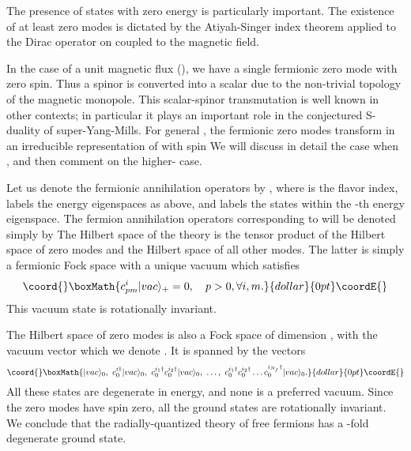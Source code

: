 \documentclass[a4paper,12pt, amsfonts, amssymb]{article}
\begin{document}
The presence of \coordHE{} states with zero energy is particularly important. 
The existence of at least \coordHE{} zero modes is dictated by the Atiyah-Singer 
index theorem applied to the Dirac operator on \coordHE{} coupled to the
magnetic field. 

In the case of a unit magnetic flux (\coordHE{}), we have a single fermionic
zero mode with zero spin. Thus a spinor is converted into a scalar
due to the non-trivial topology of the magnetic monopole. This 
scalar-spinor transmutation is well known in other contexts;
in particular it plays an important role in the conjectured S-duality
of \coordHE{}  \coordHE{} super-Yang-Mills. For general \coordHE{}, the fermionic zero
modes transform in an irreducible representation of \coordHE{} with spin
\coordHE{} We will discuss in detail the case when \coordHE{}, 
and then comment on the higher-\coordHE{} case.

Let us denote the fermionic
annihilation operators by \coordHE{}, where \coordHE{} is the
flavor index, \coordHE{} labels the energy eigenspaces as above,
and \coordHE{} labels the states within the \coordHE{}-th
energy eigenspace. The fermion annihilation operators corresponding to
\coordHE{} will be denoted simply by \coordHE{}
The Hilbert space of the theory is the tensor product of the Hilbert
space of zero modes and the Hilbert space of all other modes.
The latter is simply a fermionic Fock space with a unique vacuum
\coordHE{} which satisfies
$$\coord{}\boxMath{
c^i_{pm}|vac\rangle_+=0,\quad p>0,\forall i,m.
}{dollar}{0pt}\coordE{}$$
This vacuum state is rotationally invariant.

The Hilbert space of zero modes is also a Fock space of dimension
\coordHE{}, with the vacuum vector which we denote \coordHE{}.
It is spanned by the vectors
$$\coord{}\boxMath{
|vac\rangle_0,\ c^{i\dagger}_{0}|vac\rangle_0,\ 
c^{i_1\dagger}_0 c^{i_2\dagger}_0|vac\rangle_0,\ 
\ldots,\ 
c^{i_1\dagger}_0 c^{i_2\dagger}_0\ldots c^{i_{N_f}\dagger}_0
|vac\rangle_0.
}{dollar}{0pt}\coordE{}$$
All these states are degenerate in energy, and none is 
a preferred vacuum. Since the zero modes have spin zero, all the
ground states are rotationally invariant. 
We conclude that the radially-quantized theory of free fermions 
has a \myHighlight{$2^{N_f}$}\coordHE{}-fold degenerate ground state.
\end{document}
